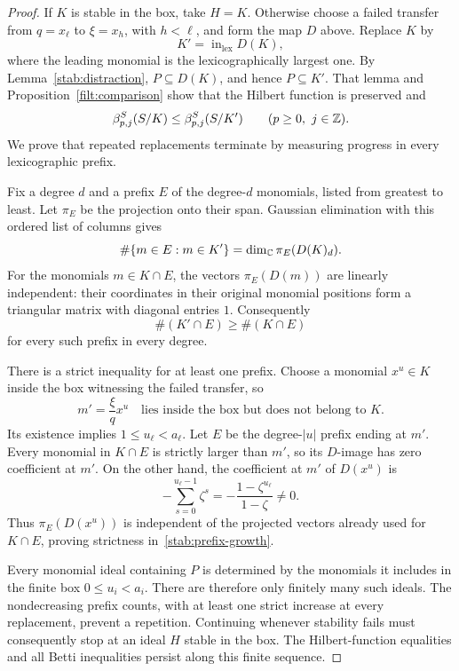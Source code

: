 \begin{proof}
If $K$ is stable in the box, take $H=K$.  Otherwise choose a failed
transfer from $q=x_\ell$ to $\xi=x_h$, with $h<\ell$, and form
the map $D$ above.  Replace $K$ by
\[
 K'=\operatorname{in}_{\mathrm{lex}}D(K),
\]
where the leading monomial is the lexicographically largest one.
By Lemma~\ref{stab:distraction}, $P\subseteq D(K)$, and hence
$P\subseteq K'$.  That lemma and Proposition~\ref{filt:comparison}
show that the Hilbert function is preserved and
\[
 \beta^S_{p,j}(S/K)\le\beta^S_{p,j}(S/K')
 \qquad(p\ge0,\ j\in\mathbb Z).
\]
We prove that repeated replacements terminate by measuring progress
in every lexicographic prefix.

Fix a degree $d$ and a prefix $E$ of the degree-$d$ monomials, listed
from greatest to least.  Let $\pi_E$ be the projection onto their span.
Gaussian elimination with this ordered list of columns gives
\[
 \#\{m\in E:m\in K'\}
       =\dim_\mathbb C\pi_E(D(K)_d).
\]
For the monomials $m\in K\cap E$, the vectors $\pi_E(D(m))$
are linearly independent: their coordinates in their original
monomial positions form a triangular matrix with diagonal entries $1$.
Consequently
\begin{equation}
\label{stab:prefix-growth}
 \#(K'\cap E)\ge\#(K\cap E)
\end{equation}
for every such prefix in every degree.

There is a strict inequality for at least one prefix.  Choose a
monomial $x^u\in K$ inside the box witnessing the failed transfer, so
\[
 m'=\frac{\xi}{q}x^u
 \quad\text{lies inside the box but does not belong to }K.
\]
Its existence implies $1\le u_\ell<a_\ell$.  Let $E$ be the
degree-$|u|$ prefix ending at $m'$.  Every monomial in $K\cap E$
is strictly larger than $m'$, so its $D$-image has zero coefficient
at $m'$.  On the other hand, the coefficient at $m'$ of $D(x^u)$ is
\[
 -\sum_{s=0}^{u_\ell-1}\zeta^s
       =-\frac{1-\zeta^{u_\ell}}{1-\zeta}\ne0.
\]
Thus $\pi_E(D(x^u))$ is independent of the projected vectors already
used for $K\cap E$, proving strictness in~\eqref{stab:prefix-growth}.

Every monomial ideal containing $P$ is determined by the monomials
it includes in the finite box $0\le u_i<a_i$.  There are therefore
only finitely many such ideals.  The nondecreasing prefix counts,
with at least one strict increase at every replacement, prevent a
repetition.  Continuing whenever stability fails must consequently
stop at an ideal $H$ stable in the box.  The Hilbert-function equalities
and all Betti inequalities persist along this finite sequence.
\end{proof}

